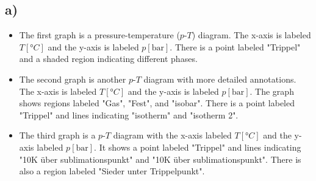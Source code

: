 

\subsection*{a)}

\begin{itemize}
    \item The first graph is a pressure-temperature ($p$-$T$) diagram. The x-axis is labeled $T [°C]$ and the y-axis is labeled $p [\text{bar}]$. There is a point labeled "Trippel" and a shaded region indicating different phases.
    \item The second graph is another $p$-$T$ diagram with more detailed annotations. The x-axis is labeled $T [°C]$ and the y-axis is labeled $p [\text{bar}]$. The graph shows regions labeled "Gas", "Fest", and "isobar". There is a point labeled "Trippel" and lines indicating "isotherm" and "isotherm 2".
    \item The third graph is a $p$-$T$ diagram with the x-axis labeled $T [°C]$ and the y-axis labeled $p [\text{bar}]$. It shows a point labeled "Trippel" and lines indicating "10K über sublimationspunkt" and "10K über sublimationspunkt". There is also a region labeled "Sieder unter Trippelpunkt".
\end{itemize}